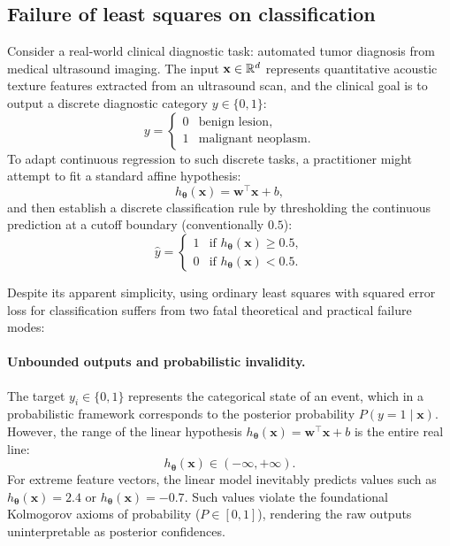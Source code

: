 \subsection{Failure of least squares on classification}
\label{sec:least_squares_failure}

Consider a real-world clinical diagnostic task: automated tumor diagnosis from medical ultrasound imaging. The input $\mathbf{x} \in \mathbb{R}^d$ represents quantitative acoustic texture features extracted from an ultrasound scan, and the clinical goal is to output a discrete diagnostic category $y \in \{0, 1\}$:
\begin{equation}
y = \begin{cases} 0 & \text{benign lesion}, \\ 1 & \text{malignant neoplasm}. \end{cases}
\label{eq:clinical_tumor_categories}
\end{equation}
To adapt continuous regression to such discrete tasks, a practitioner might attempt to fit a standard affine hypothesis:
\begin{equation}
h_{\boldsymbol{\theta}}(\mathbf{x}) = \mathbf{w}^\top \mathbf{x} + b,
\label{eq:linear_hypothesis_classification}
\end{equation}
and then establish a discrete classification rule by thresholding the continuous prediction at a cutoff boundary (conventionally $0.5$):
\begin{equation}
\hat{y} = \begin{cases} 1 & \text{if } h_{\boldsymbol{\theta}}(\mathbf{x}) \ge 0.5, \\ 0 & \text{if } h_{\boldsymbol{\theta}}(\mathbf{x}) < 0.5. \end{cases}
\label{eq:naive_thresholding}
\end{equation}

Despite its apparent simplicity, using ordinary least squares with squared error loss for classification suffers from two fatal theoretical and practical failure modes:

\paragraph{Unbounded outputs and probabilistic invalidity.}
The target $y_i \in \{0, 1\}$ represents the categorical state of an event, which in a probabilistic framework corresponds to the posterior probability $P(y=1 \mid \mathbf{x})$. However, the range of the linear hypothesis $h_{\boldsymbol{\theta}}(\mathbf{x}) = \mathbf{w}^\top \mathbf{x} + b$ is the entire real line:
\begin{equation}
h_{\boldsymbol{\theta}}(\mathbf{x}) \in (-\infty, +\infty).
\end{equation}
For extreme feature vectors, the linear model inevitably predicts values such as $h_{\boldsymbol{\theta}}(\mathbf{x}) = 2.4$ or $h_{\boldsymbol{\theta}}(\mathbf{x}) = -0.7$. Such values violate the foundational Kolmogorov axioms of probability ($P \in [0, 1]$), rendering the raw outputs uninterpretable as posterior confidences.

